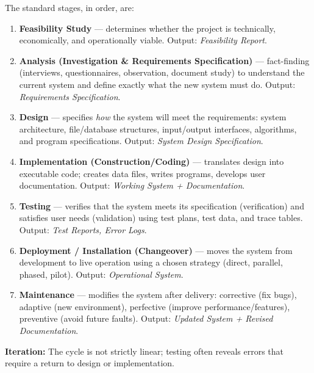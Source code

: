 \documentclass[11pt]{article}
\begin{document}
\begin{propriete}
The standard stages, in order, are:
\begin{enumerate}
\item \textbf{Feasibility Study} — determines whether the project is technically, economically, and operationally viable. Output: \emph{Feasibility Report}.
\item \textbf{Analysis (Investigation \& Requirements Specification)} — fact-finding (interviews, questionnaires, observation, document study) to understand the current system and define exactly what the new system must do. Output: \emph{Requirements Specification}.
\item \textbf{Design} — specifies \emph{how} the system will meet the requirements: system architecture, file/database structures, input/output interfaces, algorithms, and program specifications. Output: \emph{System Design Specification}.
\item \textbf{Implementation (Construction/Coding)} — translates design into executable code; creates data files, writes programs, develops user documentation. Output: \emph{Working System + Documentation}.
\item \textbf{Testing} — verifies that the system meets its specification (verification) and satisfies user needs (validation) using test plans, test data, and trace tables. Output: \emph{Test Reports, Error Logs}.
\item \textbf{Deployment / Installation (Changeover)} — moves the system from development to live operation using a chosen strategy (direct, parallel, phased, pilot). Output: \emph{Operational System}.
\item \textbf{Maintenance} — modifies the system after delivery: corrective (fix bugs), adaptive (new environment), perfective (improve performance/features), preventive (avoid future faults). Output: \emph{Updated System + Revised Documentation}.
\end{enumerate}
\textbf{Iteration:} The cycle is not strictly linear; testing often reveals errors that require a return to design or implementation.
\end{propriete}
\end{document}
